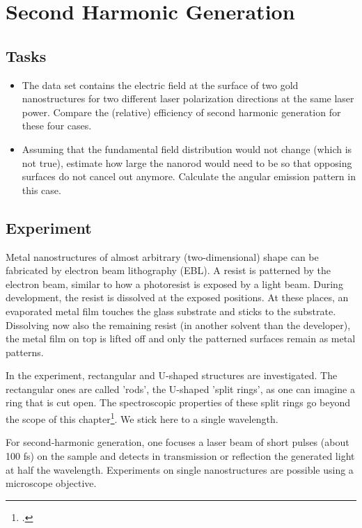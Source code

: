 \renewcommand{\lastmod}{July 1, 2021}
\renewcommand{\chapterauthors}{Markus Lippitz}


\chapter{Second Harmonic Generation}


\section{Tasks}

\begin{itemize}
\item The data set contains the electric field at the surface of two gold nanostructures for two different laser polarization directions at the same laser power. Compare the (relative)  efficiency of second harmonic generation for these four cases.

\item Assuming that the fundamental field distribution would not change (which is not true), estimate how large the nanorod would need to be so that opposing surfaces do not cancel out anymore. Calculate the angular emission pattern in this case.
\end{itemize}

\section{Experiment}

Metal nanostructures of almost arbitrary (two-dimensional) shape can be fabricated by electron beam lithography (EBL). A resist is patterned by the electron beam, similar to how a photoresist is exposed by a light beam. During development, the resist is dissolved at the exposed positions. At these places, an evaporated metal film touches the glass substrate and sticks to the substrate. Dissolving now also the remaining resist (in another solvent than the developer), the metal film on top is lifted off and only the patterned surfaces remain as metal patterns.

In the experiment, rectangular and U-shaped structures are investigated. The rectangular ones are called 'rods', the U-shaped 'split rings', as one can imagine a ring that is cut open. The spectroscopic properties of these split rings go beyond the scope of this chapter\footcite{klein06_science}. We stick here to a single wavelength.

For second-harmonic generation, one focuses a  laser beam of short pulses (about 100 fs) on the sample and detects in transmission or reflection the generated light at half the wavelength. Experiments on single nanostructures are possible using a microscope objective.

